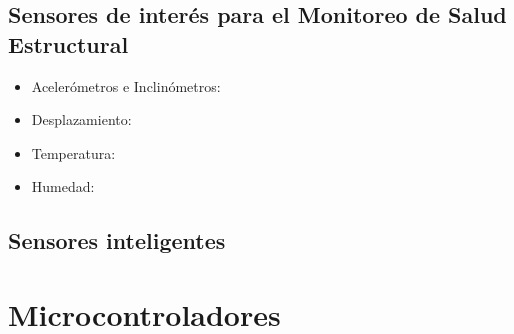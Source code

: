 \subsection{Sensores de interés para el Monitoreo de Salud Estructural}

    \begin{itemize}
        \item Acelerómetros e Inclinómetros:
        \item Desplazamiento:
        \item Temperatura:
        \item Humedad:
    \end{itemize}

\subsection{Sensores inteligentes}

\section{Microcontroladores}